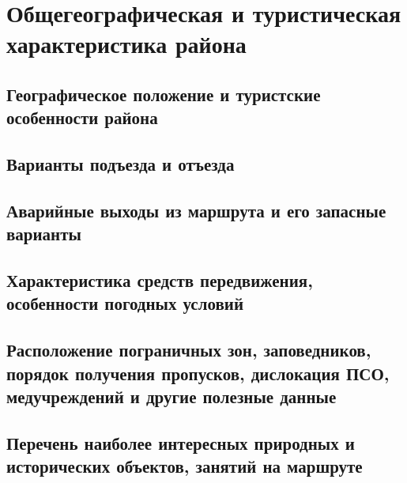 \section{Общегеографическая и туристическая характеристика района}
\subsection{Географическое положение и туристские особенности района}
\subsection{Варианты подъезда и отъезда}
\subsection{Аварийные выходы из маршрута и его запасные варианты}
\subsection{Характеристика средств передвижения, особенности погодных условий} \subsection{Расположение пограничных зон, заповедников, порядок получения пропусков, дислокация ПСО, медучреждений и другие полезные данные}
\subsection{Перечень наиболее интересных природных и исторических объектов, занятий на маршруте}
